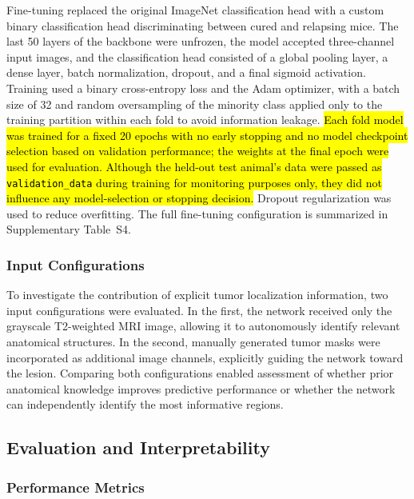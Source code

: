 \documentclass{article}
\begin{document}
Fine-tuning replaced the original ImageNet classification head with a custom binary classification head discriminating between cured and relapsing mice. The last 50 layers of the backbone were unfrozen, the model accepted three-channel input images, and the classification head consisted of a global pooling layer, a dense layer, batch normalization, dropout, and a final sigmoid activation. Training used a binary cross-entropy loss and the Adam optimizer, with a batch size of 32 and random oversampling of the minority class applied only to the training partition within each fold to avoid information leakage. \hl{Each fold model was trained for a fixed 20 epochs with no early stopping and no model checkpoint selection based on validation performance; the weights at the final epoch were used for evaluation. Although the held-out test animal's data were passed as \texttt{validation\_data} during training for monitoring purposes only, they did not influence any model-selection or stopping decision.} Dropout regularization was used to reduce overfitting. The full fine-tuning configuration is summarized in Supplementary Table~S4.


\subsubsection{Input Configurations}

To investigate the contribution of explicit tumor localization information, two input configurations were evaluated. In the first, the network received only the grayscale T2-weighted MRI image, allowing it to autonomously identify relevant anatomical structures. In the second, manually generated tumor masks were incorporated as additional image channels, explicitly guiding the network toward the lesion. Comparing both configurations enabled assessment of whether prior anatomical knowledge improves predictive performance or whether the network can independently identify the most informative regions.

\subsection{Evaluation and Interpretability}

\subsubsection{Performance Metrics}
\end{document}
